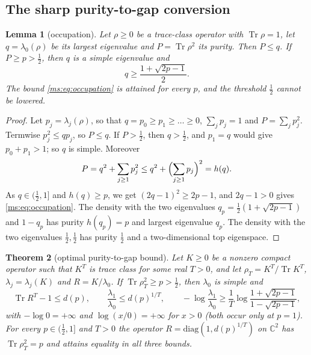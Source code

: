 \documentclass[11pt,a4paper]{amsart}
\newtheorem{theorem}{Theorem}[section]
\newtheorem{lemma}[theorem]{Lemma}
\theoremstyle{definition}
\theoremstyle{remark}
\numberwithin{equation}{section}
\DeclareMathOperator{\Tr}{Tr}        %
\newcommand{\C}{\mathbb{C}}          %
\begin{document}
\subsection{The sharp purity-to-gap conversion}

\begin{lemma}[occupation]\label{ms:lem:occupation}
Let $\rho\ge0$ be a trace-class operator with $\Tr\rho=1$, let $q=\lambda_0(\rho)$ be its largest eigenvalue and $P=\Tr\rho^2$ its purity. Then $P\le q$. If $P\ge p>\frac12$, then $q$ is a simple eigenvalue and
\begin{equation}\label{ms:eq:occupation}
q\ge\frac{1+\sqrt{2p-1}}{2}.
\end{equation}
The bound \eqref{ms:eq:occupation} is attained for every $p$, and the threshold $\frac12$ cannot be lowered.
\end{lemma}

\begin{proof}
Let $p_j=\lambda_j(\rho)$, so that $q=p_0\ge p_1\ge\dots\ge0$, $\sum_jp_j=1$ and $P=\sum_jp_j^2$. Termwise $p_j^2\le qp_j$, so $P\le q$. If $P>\frac12$, then $q>\frac12$, and $p_1=q$ would give $p_0+p_1>1$; so $q$ is simple. Moreover
\[
P=q^2+\sum_{j\ge1}p_j^2\le q^2+\Bigl(\sum_{j\ge1}p_j\Bigr)^2=h(q).
\]
As $q\in(\frac12,1]$ and $h(q)\ge p$, we get $(2q-1)^2\ge2p-1$, and $2q-1>0$ gives \eqref{ms:eq:occupation}. The density with the two eigenvalues $q_p=\frac12(1+\sqrt{2p-1})$ and $1-q_p$ has purity $h(q_p)=p$ and largest eigenvalue $q_p$. The density with the two eigenvalues $\frac12,\frac12$ has purity $\frac12$ and a two-dimensional top eigenspace.
\end{proof}

\begin{theorem}[optimal purity-to-gap bound]\label{ms:thm:sharp}
Let $K\ge0$ be a nonzero compact operator such that $K^T$ is trace class for some real $T>0$, and let $\rho_T=K^T/\Tr K^T$, $\lambda_j=\lambda_j(K)$ and $R=K/\lambda_0$. If $\Tr\rho_T^2\ge p>\frac12$, then $\lambda_0$ is simple and
\begin{equation}
\Tr R^T-1\le d(p),\qquad \frac{\lambda_1}{\lambda_0}\le d(p)^{1/T},\qquad -\log\frac{\lambda_1}{\lambda_0}\ge\frac1T\log\frac{1+\sqrt{2p-1}}{1-\sqrt{2p-1}},
\end{equation}
with $-\log0=+\infty$ and $\log(x/0)=+\infty$ for $x>0$ (both occur only at $p=1$). For every $p\in(\frac12,1]$ and $T>0$ the operator $R=\mathrm{diag}(1,d(p)^{1/T})$ on $\C^2$ has $\Tr\rho_T^2=p$ and attains equality in all three bounds.
\end{theorem}
\end{document}
